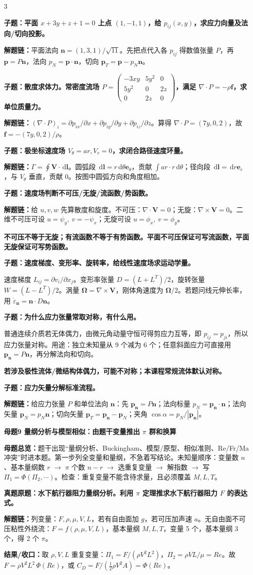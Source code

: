 \documentclass[a4paper]{article}
\newcommand{\mt}[1]{\vspace{0.22pt}\colorbox{M}{\parbox{\dimexpr\linewidth-2\fboxsep}{\color{white}\bfseries #1}}\par}
\newcommand{\qt}[1]{\vspace{0.10pt}\colorbox{Q}{\parbox{\dimexpr\linewidth-2\fboxsep}{\color{white}\bfseries #1}}\par}
\newcommand{\ans}[1]{\colorbox{G}{\parbox{\dimexpr\linewidth-2\fboxsep}{#1}}\par}
\newcommand{\warn}[1]{\colorbox{Y}{\parbox{\dimexpr\linewidth-2\fboxsep}{\color{E}\bfseries #1}}\par}
\newcommand{\chain}[1]{{\color{A}\bfseries 解题链：}#1\par}
\newcommand{\res}[1]{{\color{E}\bfseries 结果/收口：}#1\par}
\newcommand{\dd}{\,\mathrm d}
\newcommand{\mview}[1]{\ans{\textbf{母题总览：}#1}}
\begin{document}
\begin{multicols}{3}
\qt{子题：平面 $x+3y+z+1=0$ 上点 $(1,-1,1)$，给 $p_{ij}(x,y)$，求应力向量及法向/切向投影。}
\chain{平面法向 $\bm n=(1,3,1)/\sqrt{11}$。先把点代入各 $p_{ij}$ 得数值张量 $P$，再 $\bm p=P\bm n$，法向 $p_N=\bm p\cdot\bm n$，切向 $\bm p_T=\bm p-p_N\bm n$。}

\qt{子题：散度求体力。常密度流场 $P=\begin{pmatrix}-3xy&5y^2&0\\5y^2&0&2z\\0&2z&0\end{pmatrix}$，满足 $\nabla\cdot P=-\rho\bm f$，求单位质量力。}
\chain{$(\nabla\cdot P)_i=\partial p_{ix}/\partial x+\partial p_{iy}/\partial y+\partial p_{iz}/\partial z$。算得 $\nabla\cdot P=(7y,0,2)$，故 $\bm f=-(7y,0,2)/\rho$。}

\qt{子题：极坐标速度场 $V_\theta=ar,V_r=0$，求闭合路径速度环量。}
\chain{$\Gamma=\oint\bm V\cdot\dd\bm l$。圆弧段 $\dd\bm l=r\dd\theta\bm e_\theta$，贡献 $\int ar\cdot r\dd\theta$；径向段 $\dd\bm l=\dd r\bm e_r$，与 $V_\theta$ 垂直，贡献 0。按图中圆弧方向和角度相加。}

\qt{子题：速度场判断不可压/无旋/流函数/势函数。}
\chain{给 $u,v,w$ 先算散度和旋度。不可压：$\nabla\cdot\bm V=0$；无旋：$\nabla\times\bm V=0$。二维不可压可设 $u=\psi_y,\ v=-\psi_x$；无旋可设 $u=\phi_x,\ v=\phi_y$。}
\warn{不可压不等于无旋；有流函数不等于有势函数。平面不可压保证可写流函数，平面无旋保证可写势函数。}

\qt{子题：速度梯度、变形率、旋转率，给线性速度场求运动学量。}
\ans{速度梯度 $L_{ij}=\partial v_i/\partial x_j$。变形率张量 $D=(L+L^T)/2$，旋转张量 $W=(L-L^T)/2$。涡量 $\bm\Omega=\nabla\times\bm V$，刚体角速度为 $\bm\Omega/2$。若题问线元伸长率，用 $\dot\varepsilon_{\bm n}=\bm n\cdot D\bm n$。}

\qt{子题：为什么应力张量常取对称，有什么用。}
\ans{普通连续介质若无体偶力，由微元角动量守恒可得剪应力互等，即 $p_{ij}=p_{ji}$，所以应力张量对称。用途：独立未知量从 9 个减为 6 个；任意斜面应力可直接用 $\bm p_{\bm n}=P\bm n$，再分解法向和切向。}
\warn{若涉及极性流体/微结构体偶力，可能不对称；本课程常规流体默认对称。}

\qt{子题：应力矢量分解标准流程。}
\chain{给应力张量 $P$ 和单位法向 $\bm n$：先 $\bm p_{\bm n}=P\bm n$；法向标量 $p_N=\bm p_{\bm n}\cdot\bm n$；法向矢量 $\bm p_N=p_N\bm n$；切向矢量 $\bm p_T=\bm p_{\bm n}-\bm p_N$；夹角 $\cos\alpha=p_N/|\bm p_{\bm n}|$。}


\mt{母题9 量纲分析与模型相似：由题干变量推出 $\pi$ 群和换算}
\mview{题干出现“量纲分析、Buckingham、模型/原型、相似准则、Re/Fr/Ma 冲突”时进本题。第一步列全变量和量纲，不急着写结论。未知量顺序：变量数 $n$、基本量纲数 $r$ $\to$ $\pi$ 个数 $n-r$ $\to$ 选重复变量 $\to$ 解指数 $\to$ 写 $\Pi_1=\Phi(\Pi_2,\cdots)$。检查：重复变量不能含待求量，且必须覆盖 $M,L,T$。}
\qt{真题原题：水下航行器阻力量纲分析。利用 $\pi$ 定理推求水下航行器阻力 $F$ 的表达式。}
\chain{列变量：$F,\rho,\mu,V,L$，若有自由面加 $g$，若可压加声速 $a$。无自由面不可压粘性外绕流：$F=f(\rho,\mu,V,L)$，基本量纲 $M,L,T$，变量 5 个，基本量纲 3 个，得 2 个 $\pi$。}
\res{取 $\rho,V,L$ 重复变量：$\Pi_1=F/(\rho V^2L^2)$，$\Pi_2=\rho VL/\mu=Re$。故 $F=\rho V^2L^2\,\Phi(Re)$，或 $C_D=F/(\frac12\rho V^2A)=\Phi(Re)$。}


\end{multicols}
\end{document}
